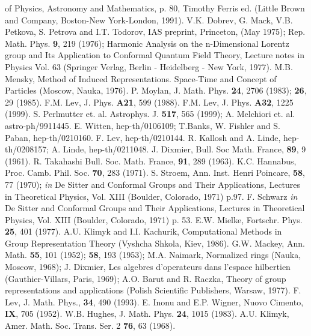 \documentclass[a4paper,12pt]{article}%
\begin{document}
\begin{thebibliography}{99}
{of Physics, Astronomy and Mathematics}, p. 80, Timothy Ferris ed.
(Little Brown and Company, Boston-New York-London, 1991).
 V.K. Dobrev, G. Mack, V.B. Petkova, 
S. Petrova and I.T. Todorov, IAS preprint, Princeton, (May 
1975); Rep. Math. Phys. {\bf 9}, 219 (1976);
Harmonic Analysis on the n-Dimensional Lorentz 
group and Its Application to Conformal Quantum Field Theory,
Lecture notes in Physics Vol. 63 (Springer Verlag,
Berlin - Heidelberg - New York, 1977). 
 M.B. Mensky, Method of Induced Representations.
Space-Time and Concept of Particles (Moscow, Nauka, 1976). 
 P. Moylan, J. Math. Phys. {\bf 24}, 2706 (1983);
{\bf 26}, 29 (1985).
 F.M. Lev, J. Phys. {\bf A21}, 599 (1988).
 F.M. Lev, J. Phys. {\bf A32}, 1225 (1999).
 S. Perlmutter et. al. Astrophys. J. {\bf 517},
565 (1999); A. Melchiori et. al. astro-ph/9911445.
 E. Witten, hep-th/0106109; T.Banks, W. Fishler
and S. Paban, hep-th/0210160.
 F. Lev, hep-th/0210144.
 R. Kallosh and A. Linde, hep-th/0208157;
A. Linde, hep-th/0211048.
 J. Dixmier, Bull. Soc Math. France, {\bf 89}, 9 (1961).
 R. Takahashi Bull. Soc. Math. France, {\bf 91}, 289 (1963).
 K.C. Hannabus, Proc. Camb. Phil. Soc. {\bf 70}, 283 (1971).
 S. Stroem,  Ann. Inst. Henri Poincare, {\bf 58}, 
77 (1970); {\it in} De Sitter and Conformal Groups and
Their Applications, Lectures in Theoretical Physics, Vol. XIII
(Boulder, Colorado, 1971) p.97.
 F. Schwarz {\it in} De Sitter and Conformal Groups and
Their Applications, Lectures in Theoretical Physics, Vol. XIII
(Boulder, Colorado, 1971) p. 53. 
 E.W. Mielke, Fortschr. Phys. {\bf 25}, 401 (1977).
 A.U. Klimyk and I.I. Kachurik, Computational 
Methods in Group Representation Theory 
(Vyshcha Shkola, Kiev, 1986).
 G.W. Mackey, Ann. Math. {\bf 55}, 101 (1952); 
{\bf 58}, 193 (1953); M.A. Naimark, Normalized rings 
(Nauka, Moscow, 1968);
J. Dixmier, Les  algebres  d'operateurs dans l'espace
   hilbertien (Gauthier-Villars, Paris, 1969);
 A.O. Barut and R. Raczka, Theory of group 
   representations  and
   applications (Polish  Scientific  Publishers, Warsaw, 1977). 
 F. Lev, J. Math. Phys., {\bf 34}, 490 (1993).
 E. Inonu and E.P. Wigner, Nuovo Cimento, 
{\bf IX}, 705 (1952).
 W.B. Hughes, J. Math. Phys. {\bf 24}, 1015 (1983).
 A.U. Klimyk, Amer. Math. Soc. Trans. Ser.
2 {\bf 76}, 63 (1968).

\end{thebibliography}
\end{document}
